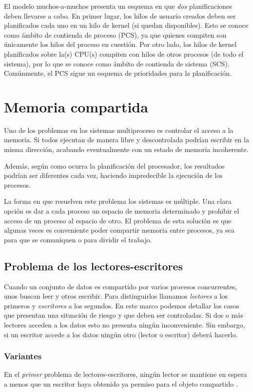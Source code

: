 El modelo muchos-a-muchos presenta un esquema en que \emph{dos} planificaciones deben llevarse a cabo.
En primer lugar, los hilos de usuario creados deben ser planificados cada uno en un hilo de kernel (si quedan disponibles).
Esto se conoce como ámbito de contienda de proceso (PCS)\cite{silberschatz}, ya que quienes compiten son únicamente los hilos del proceso en cuestión.
Por otro lado, los hilos de kernel planificados sobre la(s) CPU(s) compiten con hilos de otros procesos (de todo el sistema), por lo que se conoce como ámbito de contienda de sistema (SCS).
Comúnmente, el PCS sigue un esquema de prioridades para la planificación.



\section{Memoria compartida}

Uno de los problemas en los sistemas multiproceso es controlar el acceso a la
memoria. Si todos ejecutan de manera libre y
descontrolada podrían escribir en la misma dirección, acabando eventualmente con un estado de
memoria incoherente.

Además, según como ocurra la planificación del procesador, los resultados podrían
ser diferentes cada vez, haciendo impredecible la ejecución de los procesos.

La forma en que resuelven este problema los sistemas es múltiple. Una clara
opción es dar a cada proceso un espacio de memoria determinado y prohibir el
acceso de un proceso al espacio de otro. El problema de esta solución es que
algunas veces es conveniente poder compartir memoria entre procesos, ya sea para
que se comuniquen o para dividir el trabajo.

\subsection{Problema de los lectores-escritores}
Cuando un conjunto de datos es compartido por varios procesos concurrentes, unos buscan leer y otros escribir.
Para distinguirlos llamamos \emph{lectores} a los primeros y \emph{escritores} a los segundos\cite{silberschatz}.
En este marco podemos detallar los casos que presentan una situación de riesgo y que deben ser controladas.
Si dos o más lectores acceden a los datos esto no presenta ningún inconveniente.
Sin embargo, si un escritor accede a los datos ningún otro (lector o escritor) deberá hacerlo.

\subsubsection{Variantes}
En el \emph{primer} problema de lectores-escritores,
ningún lector se mantiene en espera a menos que un escritor haya obtenido ya permiso para el objeto
compartido \cite{silberschatz}.

